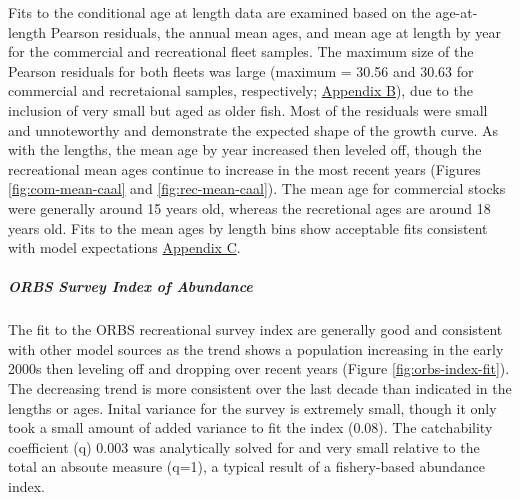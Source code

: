 \documentclass[11pt,
  english,
  a4paper,
]{article}
\begin{document}
Fits to the conditional age at length data are examined based on the age-at-length Pearson residuals, the annual mean ages, and mean age at length by year for the commercial and recreational fleet samples. The maximum size of the Pearson residuals for both fleets was large (maximum = 30.56 and 30.63 for commercial and recretaional samples, respectively; {\protect\hyperlink{app_b}{Appendix B}\leavevmode\tagmcend\tagstructend}), due to the inclusion of very small but aged as older fish. Most of the residuals were small and unnoteworthy and demonstrate the expected shape of the growth curve. As with the lengths, the mean age by year increased then leveled off, though the recreational mean ages continue to increase in the most recent years (Figures \ref{fig:com-mean-caal} and \ref{fig:rec-mean-caal}). The mean age for commercial stocks were generally around 15 years old, whereas the recretional ages are around 18 years old. Fits to the mean ages by length bins show acceptable fits consistent with model expectations {\protect\hyperlink{app_c}{Appendix C}\leavevmode\tagmcend\tagstructend}.

\leavevmode\tagmcend\tagstructend\par


\hypertarget{orbs-survey-index-of-abundance}{%
\subparagraph{ORBS Survey Index of Abundance}\label{orbs-survey-index-of-abundance}}

\leavevmode\tagmcend\tagstructend


The fit to the ORBS recreational survey index are generally good and consistent with other model sources as the trend shows a population increasing in the early 2000s then leveling off and dropping over recent years (Figure \ref{fig:orbs-index-fit}). The decreasing trend is more consistent over the last decade than indicated in the lengths or ages. Inital variance for the survey is extremely small, though it only took a small amount of added variance to fit the index (0.08). The catchability coefficient (q) 0.003 was analytically solved for and very small relative to the total an absoute measure (q=1), a typical result of a fishery-based abundance index.

\leavevmode\tagmcend\tagstructend\par

\end{document}
